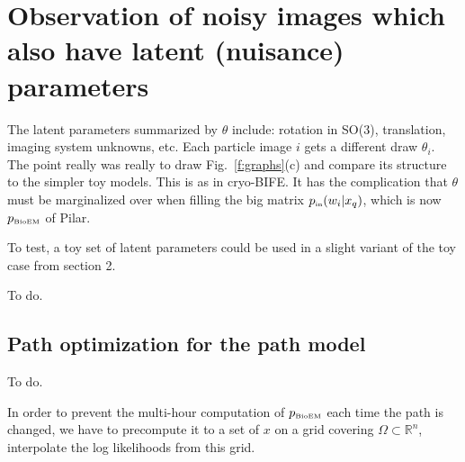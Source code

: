 \documentclass[10pt]{article}
\newcommand{\tbox}[1]{{\mbox{\tiny #1}}}
\newcommand{\R}{\mathbb{R}}
\begin{document}
\section{Observation of noisy images which also have latent (nuisance) parameters}


The latent parameters summarized by $\theta$ include:
rotation in SO(3), translation, imaging system unknowns, etc.
Each particle image $i$ gets a different draw $\theta_i$.
The point really was really to draw Fig.~\ref{f:graphs}(c)
and compare its structure to the simpler toy models.
This is as in cryo-BIFE.
It has the complication that $\theta$ must be marginalized over
when filling the big matrix $p_\tbox{in}(w_i | x_q)$, which is now
$p_\tbox{BioEM}$ of Pilar.

To test, a toy set of latent parameters
could be used in a slight variant of the toy case from section 2.

To do.

\subsection{Path optimization for the path model}

To do.

In order to prevent the multi-hour computation of $p_\tbox{BioEM}$ each
time the path is changed, we have to precompute it to a set of $x$ on a
grid covering $\Omega \subset \R^n$,
interpolate the log likelihoods from this grid.






\end{document}
